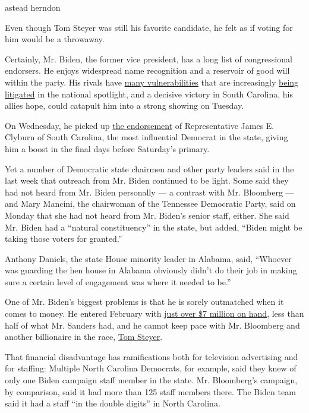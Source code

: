 astead herndon

Even though Tom Steyer was still his favorite candidate, he felt as if
voting for him would be a throwaway.

Certainly, Mr. Biden, the former vice president, has a long list of
congressional endorsers. He enjoys widespread name recognition and a
reservoir of good will within the party. His rivals have
\href{https://www.nytimes3xbfgragh.onion/2020/02/25/us/politics/south-carolina-debate-recap.html}{many
vulnerabilities} that are increasingly
\href{https://www.nytimes3xbfgragh.onion/2020/02/20/us/politics/bloomberg-nevada-debate.html}{being
litigated} in the national spotlight, and a decisive victory in South
Carolina, his allies hope, could catapult him into a strong showing on
Tuesday.

On Wednesday, he picked up
\href{https://www.nytimes3xbfgragh.onion/live/2020/south-carolina-debate-primary-02-26\#jim-clyburn-endorsement}{the
endorsement} of Representative James E. Clyburn of South Carolina, the
most influential Democrat in the state, giving him a boost in the final
days before Saturday's primary.

Yet a number of Democratic state chairmen and other party leaders said
in the last week that outreach from Mr. Biden continued to be light.
Some said they had not heard from Mr. Biden personally --- a contrast
with Mr. Bloomberg --- and Mary Mancini, the chairwoman of the Tennessee
Democratic Party, said on Monday that she had not heard from Mr. Biden's
senior staff, either. She said Mr. Biden had a ``natural constituency''
in the state, but added, ``Biden might be taking those voters for
granted.''

Anthony Daniels, the state House minority leader in Alabama, said,
``Whoever was guarding the hen house in Alabama obviously didn't do
their job in making sure a certain level of engagement was where it
needed to be.''

One of Mr. Biden's biggest problems is that he is sorely outmatched when
it comes to money. He entered February with
\href{https://www.nytimes3xbfgragh.onion/interactive/2020/02/21/us/politics/democratic-fundraising-numbers-february.html}{just
over \$7 million on hand}, less than half of what Mr. Sanders had, and
he cannot keep pace with Mr. Bloomberg and another billionaire in the
race,
\href{https://www.nytimes3xbfgragh.onion/interactive/2020/us/elections/tom-steyer.html}{Tom
Steyer}.

That financial disadvantage has ramifications both for television
advertising and for staffing: Multiple North Carolina Democrats, for
example, said they knew of only one Biden campaign staff member in the
state. Mr. Bloomberg's campaign, by comparison, said it had more than
125 staff members there. The Biden team said it had a staff ``in the
double digits'' in North Carolina.

